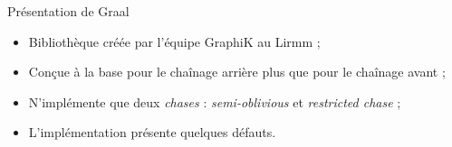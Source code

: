 \begin{frame}{Présentation de Graal}
    \begin{itemize}
        \item Bibliothèque créée par l'équipe GraphiK au Lirmm ;
        \item Conçue à la base pour le chaînage arrière plus que pour le chaînage avant ;
        \item N'implémente que deux \textit{chases} : \textit{semi-oblivious} et \textit{restricted chase} ;
        \item L'implémentation présente quelques défauts.
    \end{itemize}
\end{frame}